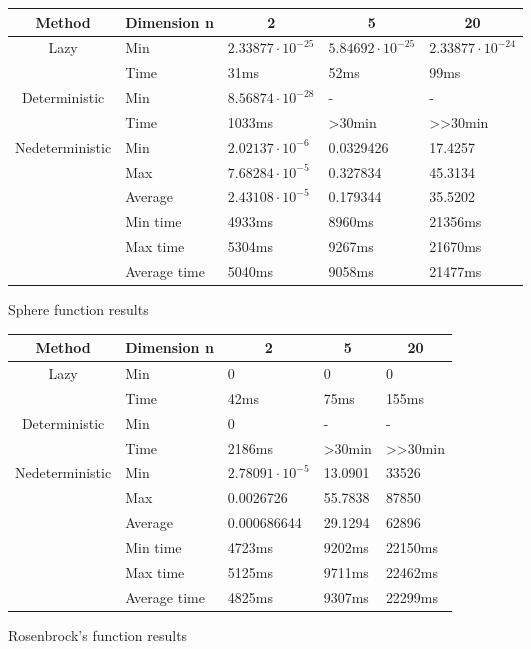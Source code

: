 \documentclass{article}
\begin{document}
\begin{figure}[!h]
\begin{tabular}{|c|l|l|l|l|}
\hline
Method & \multicolumn{1}{c|}{Dimension n} & \multicolumn{1}{c|}{2} & \multicolumn{1}{c|}{5} & \multicolumn{1}{c|}{20} \\ \hline
\multirow{2}{*}{Lazy} & Min & $2.33877 \cdot 10^{-25}$ & $5.84692 \cdot 10^{-25}$ & $2.33877 \cdot 10^{-24}$ \\ \cline{2-5} 
 & Time & 31ms & 52ms & 99ms \\ \hline
\multirow{2}{*}{Deterministic} & Min & $8.56874 \cdot 10^{-28}$ & - & - \\ \cline{2-5} 
 & Time & 1033ms & \textgreater{}30min & \textgreater{}\textgreater{}30min \\ \hline
\multirow{6}{*}{Nedeterministic} & Min & $2.02137 \cdot 10^{-6}$ & 0.0329426 & 17.4257 \\ \cline{2-5} 
 & Max & $7.68284 \cdot 10^{-5}$ & 0.327834 & 45.3134 \\ \cline{2-5} 
 & Average & $2.43108 \cdot 10^{-5}$ & 0.179344 & 35.5202 \\ \cline{2-5} 
 & Min time & 4933ms & 8960ms & 21356ms \\ \cline{2-5} 
 & Max time & 5304ms & 9267ms & 21670ms \\ \cline{2-5} 
 & Average time & 5040ms & 9058ms & 21477ms \\ \hline
\end{tabular}
\caption{Sphere function results}
\end{figure}

\begin{figure}[!h]
\begin{tabular}{|c|l|l|l|l|}
\hline
Method & \multicolumn{1}{c|}{Dimension n} & \multicolumn{1}{c|}{2} & \multicolumn{1}{c|}{5} & \multicolumn{1}{c|}{20} \\ \hline
\multirow{2}{*}{Lazy} & Min & 0 & 0 & 0 \\ \cline{2-5} 
 & Time & 42ms & 75ms & 155ms \\ \hline
\multirow{2}{*}{Deterministic} & Min & 0 & - & - \\ \cline{2-5} 
 & Time & 2186ms & \textgreater{}30min & \textgreater{}\textgreater{}30min \\ \hline
\multirow{6}{*}{Nedeterministic} & Min & $2.78091 \cdot 10^{-5}$ & 13.0901 & 33526 \\ \cline{2-5} 
 & Max & 0.0026726 & 55.7838 & 87850 \\ \cline{2-5} 
 & Average & 0.000686644 & 29.1294 & 62896 \\ \cline{2-5} 
 & Min time & 4723ms & 9202ms & 22150ms \\ \cline{2-5} 
 & Max time & 5125ms & 9711ms & 22462ms \\ \cline{2-5} 
 & Average time & 4825ms & 9307ms & 22299ms \\ \hline
\end{tabular}
\caption{Rosenbrock's function results}
\end{figure}
\end{document}
